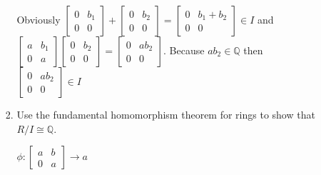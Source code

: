 \documentclass[letterpaper]{article}
\begin{document}
\begin{enumerate}
\begin{enumerate}
\begin{enumerate}
    Obviously $\left[\begin{array}{cc}0&b_1\\0&0\end{array}\right]+\left[\begin{array}{cc}0&b_2\\0&0\end{array}\right]=\left[\begin{array}{cc}0&b_1+b_2\\0&0\end{array}\right]\in I$ and $\left[\begin{array}{cc}a&b_1\\0&a\end{array}\right]\left[\begin{array}{cc}0&b_2\\0&0\end{array}\right]=\left[\begin{array}{cc}0&ab_2\\0&0\end{array}\right]$. Because $ab_2\in \mathbb{Q}$ then $\left[\begin{array}{cc}0&ab_2\\0&0\end{array}\right]\in I$
    \item
    Use the fundamental homomorphism theorem for rings to show that $R/I\cong \mathbb{Q}$.

    $\phi:\left[\begin{array}{cc}a&b\\0&a\end{array}\right]\to a$


\end{enumerate}
\end{enumerate}
\end{enumerate}
\end{document}
